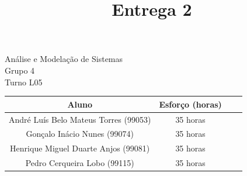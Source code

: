 \documentclass{article}
\title{{\Huge Entrega 2}}
\author{}
\date{}
\begin{document}
\maketitle
\begin{center}
	{\LARGE Análise e Modelação de Sistemas}\\
	\vspace{8mm}
	{\LARGE Grupo 4}\\
	\vspace{8mm}
	{\LARGE Turno L05}\\

	\vspace{7cm}

	\begin{tabular}{|c|c|c|c|} \hline
		\textbf{Aluno}                        & \textbf{Esforço (horas)} \\ \hline
		André Luís Belo Mateus Torres (99053) & 35 horas                 \\ \hline
		Gonçalo Inácio Nunes (99074)          & 35 horas                 \\ \hline
		Henrique Miguel Duarte Anjos (99081)  & 35 horas                 \\ \hline
		Pedro Cerqueira Lobo (99115)          & 35 horas                 \\ \hline
	\end{tabular}

\end{center}

\pagebreak
\end{document}
